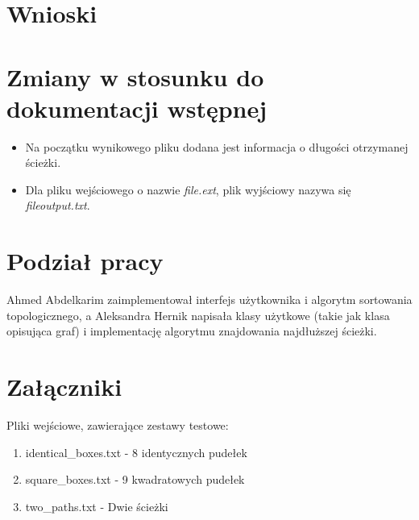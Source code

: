 \documentclass{article}
\begin{document}
\section{Wnioski}

\section{Zmiany w stosunku do dokumentacji wstępnej}
\begin{itemize}
\item Na początku wynikowego pliku dodana jest informacja o długości otrzymanej ścieżki.
\item Dla pliku wejściowego o nazwie \textit{file.ext}, plik wyjściowy nazywa się \textit{file\textunderscore output.txt}.
\end{itemize}

\section{Podział pracy}
Ahmed Abdelkarim zaimplementował interfejs użytkownika i algorytm sortowania topologicznego, a Aleksandra Hernik napisała klasy użytkowe (takie jak klasa opisująca graf) i implementację algorytmu znajdowania najdłuższej ścieżki.

\section{Załączniki}
Pliki wejściowe, zawierające zestawy testowe:
\begin{enumerate}
\item identical_boxes.txt - 8 identycznych pudełek
\item square_boxes.txt - 9 kwadratowych pudełek
\item two_paths.txt - Dwie ścieżki
\end{enumerate}
\end{document}
